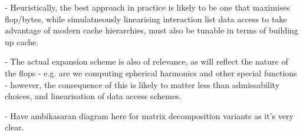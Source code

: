 - Heuristically, the best approach in practice is likely to be one that maximises flop/bytes, while simulatneously linearising interaction list data access to take advantage of modern cache hierarchies, must also be tunable in terms of building up cache.

- The actual expansion scheme is also of relevance, as will reflect the nature of the flops
    - e.g. are we computing spherical harmonics and other special functions
    - however, the consequence of this is likely to matter less than admissability choices, and linearisation of data access schemes.

- Have ambikasaran diagram here for matrix decomposition variants as it's very clear.




